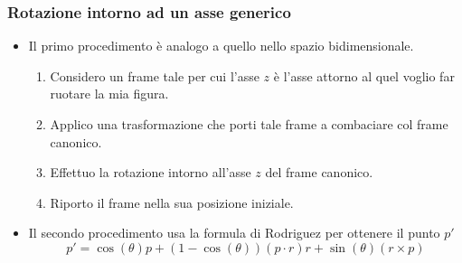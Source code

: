 \subsubsection{Rotazione intorno ad un asse generico}
\begin{itemize}
	\item Il primo procedimento \`e analogo a quello nello spazio bidimensionale.
	      \begin{enumerate}
		      \item Considero un frame tale per cui l'asse $z$ \`e l'asse attorno al quel
		            voglio far ruotare la mia figura.
		      \item Applico una trasformazione che porti tale frame a combaciare col frame
		            canonico.
		      \item Effettuo la rotazione intorno all'asse $z$ del frame canonico.
		      \item Riporto il frame nella sua posizione iniziale.
	      \end{enumerate}
	\item Il secondo procedimento usa la formula di Rodriguez per ottenere il punto $p'$
	\[
		p' = \cos(\theta) p + (1 - \cos(\theta))(p \cdot r) r + \sin(\theta)(r \times p)
	\]
\end{itemize}
